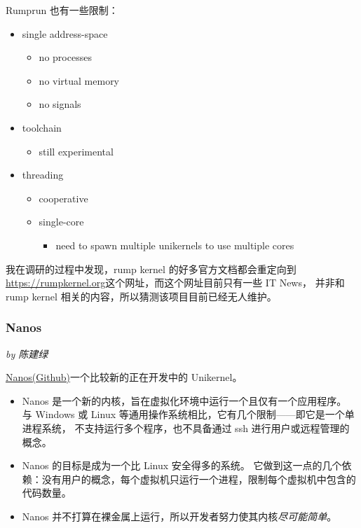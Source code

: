 \documentclass[UTF8,fontset=none,linespread=1.15]{ctexart}
\newcommand{\sectionauthor}[1]{%
\vspace*{-5ex}
\noindent\textrm{\hfill\textit{by #1}}
\vspace*{2ex}\par}
\begin{document}
Rumprun 也有一些限制：

\begin{itemize}
\item single address-space
    \begin{itemize}
    \item no processes
    \item no virtual memory
    \item no signals
    \end{itemize}
\item toolchain
    \begin{itemize}
    \item still experimental
    \end{itemize}
\item threading
    \begin{itemize}
    \item cooperative
    \item single-core
        \begin{itemize}
        \item need to spawn multiple unikernels to use multiple cores
        \end{itemize}
    \end{itemize}
\end{itemize}

我在调研的过程中发现，rump kernel 的好多官方文档都会重定向到
\url{https://rumpkernel.org}这个网址，而这个网址目前只有一些 IT News，
并非和 rump kernel 相关的内容，所以猜测该项目目前已经无人维护。

\subsubsection{Nanos}\sectionauthor{陈建绿}

\href{https://github.com/nanovms/nanos}{Nanos(Github)}一个比较新的正在开发中的 Unikernel。

\begin{itemize}
\item Nanos 是一个新的内核，旨在虚拟化环境中运行一个且仅有一个应用程序。
与 Windows 或 Linux 等通用操作系统相比，它有几个限制——即它是一个单进程系统，
不支持运行多个程序，也不具备通过 ssh 进行用户或远程管理的概念。
\item Nanos 的目标是成为一个比 Linux 安全得多的系统。
它做到这一点的几个依赖：没有用户的概念，每个虚拟机只运行一个进程，限制每个虚拟机中包含的代码数量。
\item Nanos 并不打算在裸金属上运行，所以开发者努力使其内核\textit{尽可能简单}。
\end{itemize}
\end{document}
